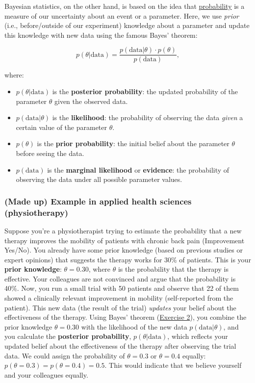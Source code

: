 \documentclass[
]{book}
\begin{document}
Bayesian statistics, on the other hand, is based on the idea that \href{https://en.wikipedia.org/wiki/Bayesian_probability}{probability} is a measure of our uncertainty about an event or a parameter.
Here, we use \emph{prior} (i.e., before/outside of our experiment) knowledge about a parameter and update this knowledge with new data using the famous Bayes' theorem:

\[
p(\theta | \text{data}) = \frac{p(\text{data} | \theta) \cdot p(\theta)}{p(\text{data})},
\]

where:

\begin{itemize}
\item
  \(p(\theta | \text{data})\) is the \textbf{posterior probability}: the updated probability of the parameter \(\theta\) given the observed data.
\item
  \(p(\text{data} | \theta)\) is the \textbf{likelihood}: the probability of observing the data \emph{given} a certain value of the parameter \(\theta\).
\item
  \(p(\theta)\) is the \textbf{prior probability}: the initial belief about the parameter \(\theta\) before seeing the data.
\item
  \(p(\text{data})\) is the \textbf{marginal likelihood} or \textbf{evidence}: the probability of observing the data under all possible parameter values.
\end{itemize}

\subsubsection{(Made up) Example in applied health sciences (physiotherapy)}\label{example1_physio}

Suppose you're a physiotherapist trying to estimate the probability that a new therapy improves the mobility of patients with chronic back pain (Improvement Yes/No).
You already have some prior knowledge (based on previous studies or expert opinions) that suggests the therapy works for 30\% of patients.
This is your \textbf{prior knowledge}: \(\theta = 0.30\), where \(\theta\) is the probability that the therapy is effective.
Your colleagues are not convinced and argue that the probability is 40\%.
Now, you run a small trial with 50 patients and observe that 22 of them showed a clinically relevant improvement in mobility (self-reported from the patient).
This new data (the result of the trial) \emph{updates} your belief about the effectiveness of the therapy.
Using Bayes' theorem (\hyperref[exercise2]{Exercise 2}), you combine the prior knowledge \(\theta = 0.30\) with the likelihood of the new data \(p(\text{data} | \theta)\), and you calculate
the \textbf{posterior probability}, \(p(\theta | \text{data})\), which reflects your updated belief about the effectiveness of the therapy after observing the trial data.
We could assign the probability of \(\theta = 0.3\) or \(\theta = 0.4\) equally: \(p(\theta = 0.3) = p(\theta = 0.4) = 0.5.\)
This would indicate that we believe yourself and your colleagues equally.
\end{document}
